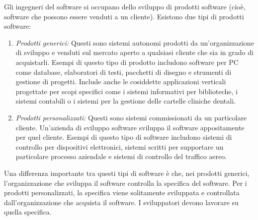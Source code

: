 Gli ingegneri del software si occupano dello sviluppo di prodotti software (cioè, software che possono essere venduti a un cliente). Esistono due tipi di prodotti software:
\begin{enumerate}
    \item \textit{Prodotti generici:} Questi sono sistemi autonomi prodotti da un'organizzazione di sviluppo e venduti sul mercato aperto a qualsiasi cliente che sia in grado di acquistarli. Esempi di questo tipo di prodotto includono software per PC come database, elaboratori di testi, pacchetti di disegno e strumenti di gestione di progetti. Include anche le cosiddette applicazioni verticali progettate per scopi specifici come i sistemi informativi per biblioteche, i sistemi contabili o i sistemi per la gestione delle cartelle cliniche dentali.
    \item \textit{Prodotti personalizzati:} Questi sono sistemi commissionati da un particolare cliente. Un'azienda di sviluppo software sviluppa il software appositamente per quel cliente. Esempi di questo tipo di software includono sistemi di controllo per dispositivi elettronici, sistemi scritti per supportare un particolare processo aziendale e sistemi di controllo del traffico aereo.
\end{enumerate}
Una differenza importante tra questi tipi di software è che, nei prodotti generici, l'organizzazione che sviluppa il software controlla la specifica del software. Per i prodotti personalizzati, la specifica viene solitamente sviluppata e controllata dall'organizzazione che acquista il software. I sviluppatori devono lavorare su quella specifica.

